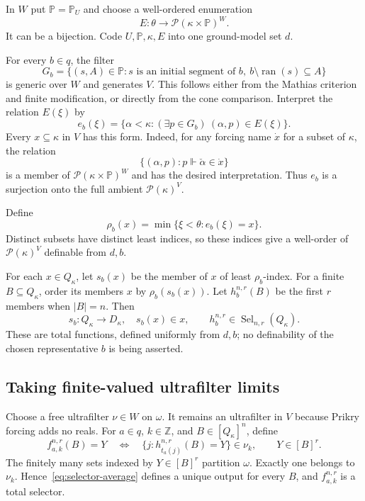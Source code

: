 \documentclass[11pt,letterpaper]{article}
\theoremstyle{definition}
\numberwithin{equation}{section}
\newcommand{\Pow}{\mathcal P}
\newcommand{\PP}{\mathbb P}
\newcommand{\Sel}{\operatorname{Sel}}
\begin{document}
In $W$ put $\PP=\PP_U$ and choose a well-ordered enumeration
\begin{equation}\label{eq:names}
E:\theta\longrightarrow\Pow(\kappa\times\PP)^W.
\end{equation}
It can be a bijection. Code $U,\PP,\kappa,E$ into one ground-model set $d$.

For every $b\in q$, the filter
\[
G_b=\{(s,A)\in\PP:
 s\text{ is an initial segment of }b,\
 b\setminus\operatorname{ran}(s)\subseteq A\}
\]
is generic over $W$ and generates $V$. This follows either from the Mathias criterion and finite modification, or directly from the cone comparison. Interpret the relation $E(\xi)$ by
\[
e_b(\xi)=\{\alpha<\kappa:(\exists p\in G_b)\ (\alpha,p)\in E(\xi)\}.
\]
Every $x\subseteq\kappa$ in $V$ has this form. Indeed, for any forcing name $\dot x$ for a subset of $\kappa$, the relation
\[
\{(\alpha,p):p\Vdash\check\alpha\in\dot x\}
\]
is a member of $\Pow(\kappa\times\PP)^W$ and has the desired interpretation. Thus $e_b$ is a surjection onto the full ambient $\Pow(\kappa)^V$.

Define
\[
\rho_b(x)=\min\{\xi<\theta:e_b(\xi)=x\}.
\]
Distinct subsets have distinct least indices, so these indices give a well-order of $\Pow(\kappa)^V$ definable from $d,b$.

For each $x\in Q_\kappa$, let $s_b(x)$ be the member of $x$ of least $\rho_b$-index. For a finite $B\subseteq Q_\kappa$, order its members $x$ by $\rho_b(s_b(x))$. Let $h_b^{n,r}(B)$ be the first $r$ members when $|B|=n$. Then
\[
s_b:Q_\kappa\to D_\kappa,\quad s_b(x)\in x,
\qquad h_b^{n,r}\in\Sel_{n,r}(Q_\kappa).
\]
These are total functions, defined uniformly from $d,b$; no definability of the chosen representative $b$ is being asserted.

\subsection{Taking finite-valued ultrafilter limits}

Choose a free ultrafilter $\nu\in W$ on $\omega$. It remains an ultrafilter in $V$ because Prikry forcing adds no reals. For $a\in q$, $k\in\mathbb Z$, and $B\in[Q_\kappa]^n$, define
\begin{equation}\label{eq:selector-average}
f_{a,k}^{n,r}(B)=Y
\quad\Longleftrightarrow\quad
\{j:h_{t_a(j)}^{n,r}(B)=Y\}\in\nu_k,
\qquad Y\in[B]^r.
\end{equation}
The finitely many sets indexed by $Y\in[B]^r$ partition $\omega$. Exactly one belongs to $\nu_k$. Hence~\eqref{eq:selector-average} defines a unique output for every $B$, and $f_{a,k}^{n,r}$ is a total selector.
\end{document}
